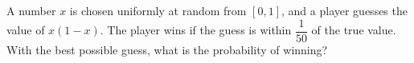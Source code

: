 A number $x$ is chosen uniformly at random from $[0,1]$, and a player guesses the value of $x(1-x)$. The player wins if the guess is within $\dfrac1{50}$ of the true value. With the best possible guess, what is the probability of winning?
